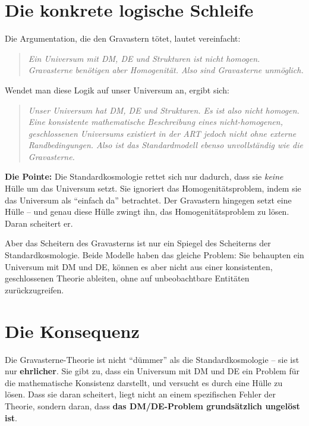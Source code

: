 \documentclass[12pt,a4paper]{article}
\begin{document}
\section{Die konkrete logische Schleife}

Die Argumentation, die den Gravastern tötet, lautet vereinfacht:

\begin{quote}
\textit{Ein Universum mit DM, DE und Strukturen ist nicht homogen. Gravasterne benötigen aber Homogenität. Also sind Gravasterne unmöglich.}
\end{quote}

Wendet man diese Logik auf unser Universum an, ergibt sich:

\begin{quote}
\textit{Unser Universum hat DM, DE und Strukturen. Es ist also nicht homogen. Eine konsistente mathematische Beschreibung eines nicht-homogenen, geschlossenen Universums existiert in der ART jedoch nicht ohne externe Randbedingungen. Also ist das Standardmodell ebenso unvollständig wie die Gravasterne.}
\end{quote}

\textbf{Die Pointe:} Die Standardkosmologie rettet sich nur dadurch, dass sie \emph{keine} Hülle um das Universum setzt. Sie ignoriert das Homogenitätsproblem, indem sie das Universum als \enquote{einfach da} betrachtet. Der Gravastern hingegen setzt eine Hülle – und genau diese Hülle zwingt ihn, das Homogenitätsproblem zu lösen. Daran scheitert er.

Aber das Scheitern des Gravasterns ist nur ein Spiegel des Scheiterns der Standardkosmologie. Beide Modelle haben das gleiche Problem: Sie behaupten ein Universum mit DM und DE, können es aber nicht aus einer konsistenten, geschlossenen Theorie ableiten, ohne auf unbeobachtbare Entitäten zurückzugreifen.

\section{Die Konsequenz}

Die Gravasterne-Theorie ist nicht \enquote{dümmer} als die Standardkosmologie – sie ist nur \textbf{ehrlicher}. Sie gibt zu, dass ein Universum mit DM und DE ein Problem für die mathematische Konsistenz darstellt, und versucht es durch eine Hülle zu lösen. Dass sie daran scheitert, liegt nicht an einem spezifischen Fehler der Theorie, sondern daran, dass \textbf{das DM/DE-Problem grundsätzlich ungelöst ist}.
\end{document}
